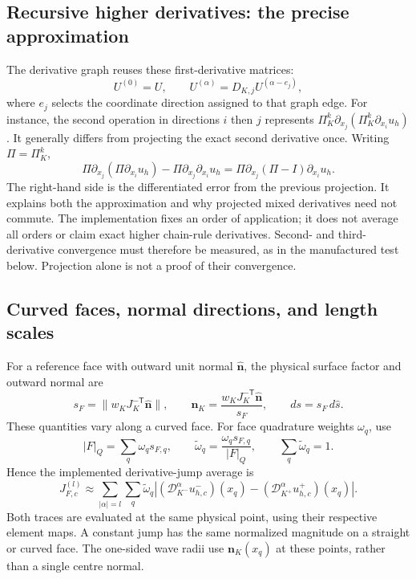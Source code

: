 \subsection{Recursive higher derivatives: the precise approximation}
The derivative graph reuses these first-derivative matrices:
\begin{equation}
 U^{(0)}=U,\qquad U^{(\alpha)}=D_{K,j}U^{(\alpha-e_j)},
 \label{eq:curved-recursion}
\end{equation}
where $e_j$ selects the coordinate direction assigned to that graph edge.
For instance, the second operation in directions $i$ then $j$ represents
$\Pi_K^k\partial_{x_j}(\Pi_K^k\partial_{x_i}u_h)$. It generally differs
from projecting the exact second derivative once. Writing $\Pi=\Pi_K^k$,
\begin{equation}
 \Pi\partial_{x_j}(\Pi\partial_{x_i}u_h)
 -\Pi\partial_{x_j}\partial_{x_i}u_h
 =\Pi\partial_{x_j}(\Pi-I)\partial_{x_i}u_h.
 \label{eq:curved-recursion-defect}
\end{equation}
The right-hand side is the differentiated error from the previous projection.
It explains both the approximation and why projected mixed derivatives need
not commute. The implementation fixes an order of application; it does not
average all orders or claim exact higher chain-rule derivatives. Second- and
third-derivative convergence must therefore be measured, as in the
manufactured test below. Projection alone is not a proof of their convergence.

\subsection{Curved faces, normal directions, and length scales}
For a reference face with outward unit normal $\widehat{\boldsymbol n}$, the
physical surface factor and outward normal are
\begin{equation}
 s_F=\|w_KJ_K^{-\mathsf T}\widehat{\boldsymbol n}\|,
 \qquad \boldsymbol n_K=
 \frac{w_KJ_K^{-\mathsf T}\widehat{\boldsymbol n}}{s_F},
 \qquad ds=s_F\,d\widehat s.
 \label{eq:curved-face-metric}
\end{equation}
These quantities vary along a curved face. For face quadrature weights
$\omega_q$, use
\begin{equation}
 |F|_Q=\sum_q\omega_qs_{F,q},\qquad
 \widetilde\omega_q=\frac{\omega_qs_{F,q}}{|F|_Q},\qquad
 \sum_q\widetilde\omega_q=1.
 \label{eq:curved-face-normalization}
\end{equation}
Hence the implemented derivative-jump average is
\begin{equation}
 J_{F,c}^{(l)}\approx\sum_{|\alpha|=l}\sum_q\widetilde\omega_q
 \left| (\mathscr D_{K^-}^{\alpha}u_{h,c}^-)(x_q)
       -(\mathscr D_{K^+}^{\alpha}u_{h,c}^+)(x_q)\right|.
\end{equation}
Both traces are evaluated at the same physical point, using their respective
element maps. A constant jump has the same normalized magnitude on a straight
or curved face. The one-sided wave radii use $\boldsymbol n_K(x_q)$ at these
points, rather than a single centre normal.

